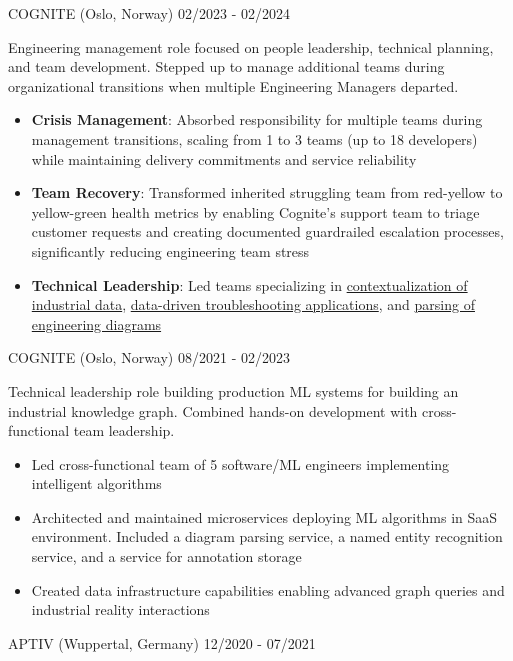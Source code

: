 \documentclass[singlesided,
               paper=a4,
               fontsize=10pt
              ]{my-resume}
\begin{document}
%
	{COGNITE (Oslo, Norway)}
	{02/2023 - 02/2024}
    {
        Engineering management role focused on people leadership, technical planning, and team development. Stepped up to manage additional teams during organizational transitions when multiple Engineering Managers departed.

        \begin{itemize}[leftmargin=2em]
            \item \textbf{Crisis Management}: Absorbed responsibility for multiple teams during management transitions, scaling from 1 to 3 teams (up to 18 developers) while maintaining delivery commitments and service reliability
            \item \textbf{Team Recovery}: Transformed inherited struggling team from red-yellow to yellow-green health metrics by enabling Cognite's support team to triage customer requests and creating documented guardrailed escalation processes, significantly reducing engineering team stress
            \item \textbf{Technical Leadership}: Led teams specializing in \href{https://www.cognite.com/en/contextualization}{contextualization of industrial data}, \href{https://www.cognite.com/en/industrial-canvas}{data-driven troubleshooting applications}, and \href{https://docs.cognite.com/cdf/integration/guides/contextualization/interactive_diagrams/}{parsing of engineering diagrams}
        \end{itemize}
    }
%
	{COGNITE (Oslo, Norway)}
	{08/2021 - 02/2023}
    {
        Technical leadership role building production ML systems for building an industrial knowledge graph. Combined hands-on development with cross-functional team leadership.
        \begin{itemize}[leftmargin=2em]
            \item Led cross-functional team of 5 software/ML engineers implementing intelligent algorithms
            \item Architected and maintained microservices deploying ML algorithms in SaaS environment. Included a diagram parsing service, a named entity recognition service, and a service for annotation storage
            \item Created data infrastructure capabilities enabling advanced graph queries and industrial reality interactions
        \end{itemize}
    }
%
    {APTIV (Wuppertal, Germany)}
    {12/2020 - 07/2021}
\end{document}
